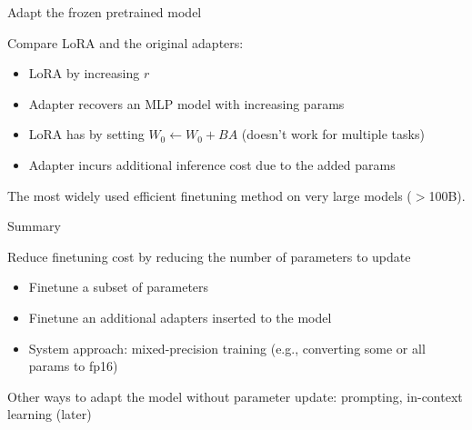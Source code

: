 \documentclass[usenames,dvipsnames,notes,11pt,aspectratio=169,hyperref={colorlinks=true, linkcolor=blue}]{beamer}
\begin{document}
\begin{frame}
    {Adapt the frozen pretrained model}

    Compare LoRA and the original adapters:
    \begin{itemize}
        \item LoRA  by increasing $r$
        \item[] Adapter recovers an MLP model with increasing params
            \pause
        \item LoRA has 
            \pause by setting $W_0 \leftarrow W_0 + BA$ (doesn't work for multiple tasks)
        \item[] Adapter incurs additional inference cost due to the added params
    \end{itemize}

    The most widely used efficient finetuning method on very large models ($>$100B).
\end{frame}

\begin{frame}
    {Summary}

    Reduce finetuning cost by reducing the number of parameters to update\\
    \begin{itemize}
        \item Finetune a subset of parameters
        \item Finetune an additional adapters inserted to the model
        \item System approach: mixed-precision training (e.g., converting some or all params to fp16)
    \end{itemize}


    Other ways to adapt the model without parameter update: prompting, in-context learning (later)


\end{frame}
\end{document}

